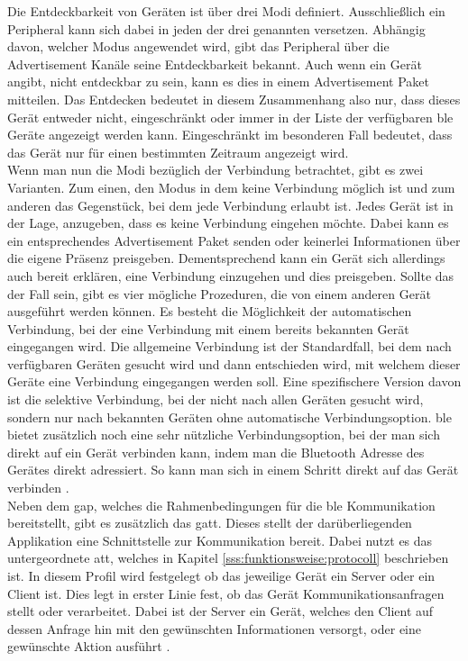 \noindent Die Entdeckbarkeit von Geräten ist über drei Modi definiert. Ausschließlich ein Peripheral kann sich dabei in jeden der drei genannten versetzen. Abhängig davon, welcher Modus angewendet wird, gibt das Peripheral über die Advertisement Kanäle seine Entdeckbarkeit bekannt. Auch wenn ein Gerät angibt, nicht entdeckbar zu sein, kann es dies in einem Advertisement Paket mitteilen. Das Entdecken bedeutet in diesem Zusammenhang also nur, dass dieses Gerät entweder nicht, eingeschränkt oder immer in der Liste der verfügbaren \ac{ble} Geräte angezeigt werden kann. Eingeschränkt im besonderen Fall bedeutet, dass das Gerät nur für einen bestimmten Zeitraum angezeigt wird.\\

\noindent Wenn man nun die Modi bezüglich der Verbindung betrachtet, gibt es zwei Varianten. Zum einen, den Modus in dem keine Verbindung möglich ist und zum anderen das Gegenstück, bei dem jede Verbindung erlaubt ist. Jedes Gerät ist in der Lage, anzugeben, dass es keine Verbindung eingehen möchte. Dabei kann es ein entsprechendes Advertisement Paket senden oder keinerlei Informationen über die eigene Präsenz preisgeben. Dementsprechend kann ein Gerät sich allerdings auch bereit erklären, eine Verbindung einzugehen und dies preisgeben. Sollte das der Fall sein, gibt es vier mögliche Prozeduren, die von einem anderen Gerät ausgeführt werden können. Es besteht die Möglichkeit der automatischen Verbindung, bei der eine Verbindung mit einem bereits bekannten Gerät eingegangen wird. Die allgemeine Verbindung ist der Standardfall, bei dem nach verfügbaren Geräten gesucht wird und dann entschieden wird, mit welchem dieser Geräte eine Verbindung eingegangen werden soll. Eine spezifischere Version davon ist die selektive Verbindung, bei der nicht nach allen Geräten gesucht wird, sondern nur nach bekannten Geräten ohne automatische Verbindungsoption. \ac{ble} bietet zusätzlich noch eine sehr nützliche Verbindungsoption, bei der man sich direkt auf ein Gerät verbinden kann, indem man die Bluetooth Adresse des Gerätes direkt adressiert. So kann man sich in einem Schritt direkt auf das Gerät verbinden \cite[Seite 38ff]{Townsend14:GSB}.\\      

\noindent Neben dem \ac{gap}, welches die Rahmenbedingungen für die \ac{ble} Kommunikation bereitstellt, gibt es zusätzlich das \ac{gatt}. Dieses stellt der darüberliegenden Applikation eine Schnittstelle zur Kommunikation bereit. Dabei nutzt es das untergeordnete \ac{att}, welches in Kapitel \ref{sss:funktionsweise:protocoll} beschrieben ist. In diesem Profil wird festgelegt ob das jeweilige Gerät ein Server oder ein Client ist. Dies legt in erster Linie fest, ob das Gerät Kommunikationsanfragen stellt oder verarbeitet. Dabei ist der Server ein Gerät, welches den Client auf dessen Anfrage hin mit den gewünschten Informationen versorgt, oder eine gewünschte Aktion ausführt \cite[Seite 30]{Usama17:BBS}.\\


